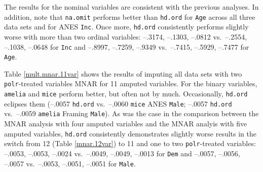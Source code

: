 \documentclass[12pt,econ]{sources/authesis}
\begin{document}
The results for the nominal variables are consistent with the previous analyses. In addition, note that \texttt{na.omit} performs better than \texttt{hd.ord} for \texttt{Age} across all three data sets and for ANES \texttt{Inc}. Once more, \texttt{hd.ord} consistently performs slightly worse with more than two ordinal variables: --.3174, --.1303, --.0812 vs.~--.2554, --.1038, --.0648 for \texttt{Inc} and --.8997, --.7259, --.9349 vs.~--.7415, --.5929, --.7477 for \texttt{Age}.

Table \ref{mult.mnar.11var} shows the results of imputing all data sets with two \texttt{polr}-treated variables MNAR for 11 amputed variables. For the binary variables, \texttt{amelia} and \texttt{mice} perform better, but often not by much. Occasionally, \texttt{hd.ord} eclipses them (--.0057 \texttt{hd.ord} vs.~--.0060 \texttt{mice} ANES \texttt{Male}; --.0057 \texttt{hd.ord} vs.~--.0059 \texttt{amelia} Framing \texttt{Male}). As was the case in the comparison between the MNAR analysis with four amputed variables and the MNAR analyis with five amputed variables, \texttt{hd.ord} consistently demonstrates slightly worse results in the switch from 12 (Table \ref{mnar.12var}) to 11 and one to two \texttt{polr}-treated variables: --.0053, --.0053, --.0024 vs.~--.0049, --.0049, --.0013 for \texttt{Dem} and --.0057, --.0056, --.0057 vs.~--.0053, --.0051, --.0051 for \texttt{Male}.

\ssp
\end{document}
